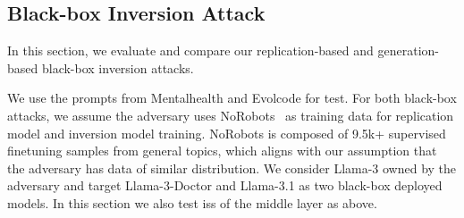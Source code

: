 \documentclass[letterpaper,twocolumn,10pt]{article}
\newcommand{\llama}{Llama}
\newcommand{\qwen}{Qwen}
\newcommand{\bheading}[1]{{\vspace{4pt}\noindent{\textbf{#1}}}}
\theoremstyle{definition}
\begin{document}
\begin{table}[t]
\caption{Evaluation results of \qwen2.5 and \qwen2.5-Coder.}
\label{tab:tbs-qwen-results}
\end{table}

\subsection{Black-box Inversion Attack}
\label{subsec:black-box-results}

In this section, we evaluate and compare our replication-based and generation-based black-box inversion attacks.


\bheading{Attack Settings.}
We use the prompts from Mentalhealth and Evolcode for test. 
For both black-box attacks, we assume the adversary uses NoRobots~\cite{no_robots} as training data for replication model and inversion model training.
NoRobots is composed of 9.5k+ supervised finetuning samples from general topics, which aligns with our assumption that the adversary has data of similar distribution.
We consider \llama-3 owned by the adversary and target \llama-3-Doctor and \llama-3.1 as two black-box deployed models.
In this section we also test \acp{is} of the middle layer as above.
\end{document}
